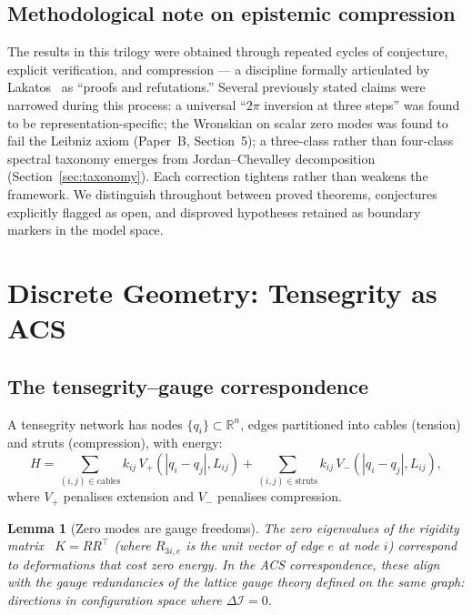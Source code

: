 \documentclass[11pt,a4paper]{article}
\theoremstyle{plain}
\newtheorem{lemma}[theorem]{Lemma}
\theoremstyle{definition}
\theoremstyle{remark}
\newcommand{\DI}{\Delta\mathcal{I}}
\begin{document}
\subsection*{Methodological note on epistemic compression}

The results in this trilogy were obtained through repeated cycles of
conjecture, explicit verification, and compression --- a discipline
formally articulated by Lakatos~\cite{Lakatos1976} as ``proofs and
refutations.''  Several previously stated claims were narrowed during
this process: a universal ``$2\pi$ inversion at three steps'' was
found to be representation-specific; the Wronskian on scalar zero
modes was found to fail the Leibniz axiom (Paper~B,
Section~5); a three-class rather than four-class spectral taxonomy
emerges from Jordan--Chevalley decomposition (Section~\ref{sec:taxonomy}).
Each correction tightens rather than weakens the framework.  We
distinguish throughout between proved theorems, conjectures explicitly
flagged as open, and disproved hypotheses retained as boundary
markers in the model space.
\section{Discrete Geometry: Tensegrity as ACS}
\label{sec:tensegrity}

\subsection{The tensegrity--gauge correspondence}

A tensegrity network has nodes $\{q_i\} \subset \mathbb{R}^n$, edges 
partitioned into cables (tension) and struts (compression), with energy:
\begin{equation}
  H = \sum_{(i,j)\in\mathrm{cables}} k_{ij}\,V_+(|q_i-q_j|, L_{ij})
    + \sum_{(i,j)\in\mathrm{struts}} k_{ij}\,V_-(|q_i-q_j|, L_{ij}),
\end{equation}
where $V_+$ penalises extension and $V_-$ penalises compression.

\begin{lemma}[Zero modes are gauge freedoms]\label{lem:zero-modes}
The zero eigenvalues of the rigidity matrix~\cite{Connelly1996} $K = R R^\top$ 
(where $R_{3i, e}$ is the unit vector of edge $e$ at node $i$) correspond to 
deformations that cost zero energy.  In the ACS correspondence, these
align with the gauge redundancies of the lattice gauge theory defined on
the same graph: directions in configuration space where $\DI = 0$.
\end{lemma}
\end{document}
